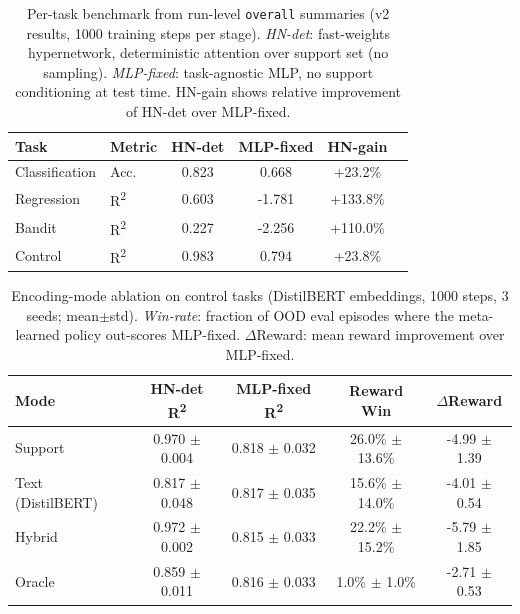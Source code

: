 \begin{table}[ht]
\centering
\begin{tabular}{llcccc}
\toprule
Task & Metric & HN-det & MLP-fixed & HN-gain \\
\midrule
  Classification & Acc. & 0.823 & 0.668 & +23.2\% \\
  Regression & R\textsuperscript{2} & 0.603 & -1.781 & +133.8\% \\
  Bandit & R\textsuperscript{2} & 0.227 & -2.256 & +110.0\% \\
  Control & R\textsuperscript{2} & 0.983 & 0.794 & +23.8\% \\
\bottomrule
\end{tabular}
\caption{Per-task benchmark from run-level \texttt{overall} summaries (v2 results, 1000 training steps per stage). \emph{HN-det}: fast-weights hypernetwork, deterministic attention over support set (no sampling). \emph{MLP-fixed}: task-agnostic MLP, no support conditioning at test time. HN-gain shows relative improvement of HN-det over MLP-fixed.}
\label{tab:task_benchmark}
\end{table}

\begin{table}[ht]
\centering
\begin{tabular}{lcccc}
\toprule
Mode & HN-det R\textsuperscript{2} & MLP-fixed R\textsuperscript{2} & Reward Win & $\Delta$Reward \\
\midrule
  Support & 0.970 $\pm$ 0.004 & 0.818 $\pm$ 0.032 & 26.0\% $\pm$ 13.6\% & -4.99 $\pm$ 1.39 \\
  Text (DistilBERT) & 0.817 $\pm$ 0.048 & 0.817 $\pm$ 0.035 & 15.6\% $\pm$ 14.0\% & -4.01 $\pm$ 0.54 \\
  Hybrid & 0.972 $\pm$ 0.002 & 0.815 $\pm$ 0.033 & 22.2\% $\pm$ 15.2\% & -5.79 $\pm$ 1.85 \\
  Oracle & 0.859 $\pm$ 0.011 & 0.816 $\pm$ 0.033 & 1.0\% $\pm$ 1.0\% & -2.71 $\pm$ 0.53 \\
\bottomrule
\end{tabular}
\caption{Encoding-mode ablation on control tasks (DistilBERT embeddings, 1000 steps, 3 seeds; mean$\pm$std). \emph{Win-rate}: fraction of OOD eval episodes where the meta-learned policy out-scores MLP-fixed. $\Delta$Reward: mean reward improvement over MLP-fixed.}
\label{tab:encoding_modes}
\end{table}
